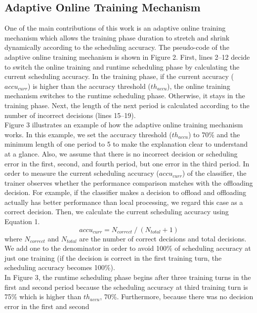 \documentclass[10pt, conference, compsocconf]{IEEEtran}
\begin{document}
{{\subsection{Adaptive Online Training Mechanism}
%
One of the main contributions of this work is an adaptive online
training mechanism which allows the training phase duration to stretch
and shrink dynamically according to the scheduling accuracy.
%
The pseudo-code of the adaptive online training mechanism is shown in
Figure 2.
%
First, lines 2--12 decide to switch the online training and runtime
scheduling phase by calculating the current scheduling accuracy.
%
In the training phase, if the current accuracy ($accu_{curr}$) is higher
than the accuracy threshold ($th_{accu}$), the online training mechanism
switches to the runtime scheduling phase.
%
Otherwise, it stays in the training phase.
%
Next, the length of the next period is calculated according to the
number of incorrect decisions (lines 15--19).\\
%
\indent Figure 3 illustrates an example of how the adaptive online
training mechanism works.
%
In this example, we set the accuracy threshold ($th_{accu}$) to 70\% and
the minimum length of one period to 5 to make the explanation clear to
understand at a glance.
%
Also, we assume that there is no incorrect decision or scheduling error
in the first, second, and fourth period, but one error in the third
period.
%
In order to measure the current scheduling accuracy ($accu_{curr}$) of
the classifier, the trainer observes whether the performance comparison
matches with the offloading decision.
%
For example, if the classifier makes a decision to offload and
offloading actually has better performance than local processing, we
regard this case as a correct decision.
%
Then, we calculate the current scheduling accuracy using Equation 1.
%
\begin{equation}
	accu_{curr} = N_{correct}\:/\:(N_{total} + 1)
\end{equation}
%
where $N_{correct}$ and $N_{total}$ are the number of correct decisions
and total decisions.
%
We add one to the denominator in order to avoid 100\% of
scheduling accuracy at just one training (if the decision is correct in
the first training turn, the scheduling accuracy becomes 100\%).\\
%
\indent In Figure 3, the runtime scheduling phase begins after three
training turns in the first and second period because the scheduling
accuracy at third training turn is 75\% which is higher than 
$th_{accu}$, 70\%.
%
Furthermore, because there was no decision error in the first and second
}}
\end{document}
